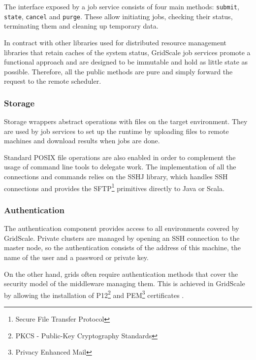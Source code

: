 The interface exposed by a job service consists of four main methods: \verb|submit|, \verb|state|, \verb|cancel| and \verb|purge|. These allow initiating jobs, checking their status, terminating them and cleaning up temporary data. 

In contract with other libraries used for distributed resource management libraries that retain caches of the system status, GridScale job services promote a functional approach and are designed to be immutable and hold as little state as possible. Therefore, all the public methods are pure and simply forward the request to the remote scheduler.

\subsubsection{Storage}

Storage wrappers abstract operations with files on the target environment. They are used by job services to set up the runtime by uploading files to remote machines and download results when jobs are done.

Standard POSIX file operations are also enabled in order to complement the usage of command line tools to delegate work. The implementation of all the connections and commands relies on the SSHJ \cite{SSHJ} library, which handles SSH connections and provides the SFTP\footnote{Secure File Transfer Protocol} primitives directly to Java or Scala.

\subsubsection{Authentication}

The authentication component provides access to all environments covered by GridScale. Private clusters are managed by opening an SSH connection to the master node, so the authentication consists of the address of this machine, the name of the user and a password or private key.

On the other hand, grids often require authentication methods that cover the security model of the middleware managing them. This is achieved in GridScale by allowing the installation of P12\footnote{PKCS - Public-Key Cryptography Standards} and PEM\footnote{Privacy Enhanced Mail} certificates \cite{Reuillon2016}.